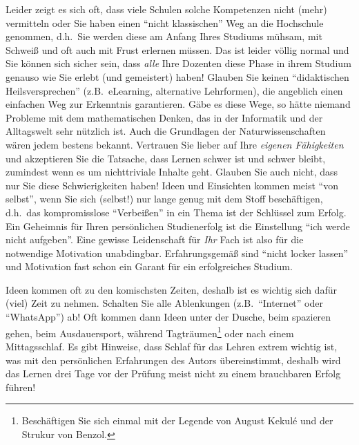 Leider zeigt es sich oft, dass viele Schulen solche Kompetenzen nicht
(mehr) vermitteln oder Sie haben einen "`nicht klassischen"' Weg an die Hochschule 
genommen, d.h.~Sie werden diese am Anfang Ihres Studiums
mühsam, mit Schweiß und oft auch mit Frust erlernen müssen. Das ist 
leider völlig normal und Sie können sich sicher sein, dass \emph{alle} Ihre Dozenten
diese Phase in ihrem Studium genauso wie Sie erlebt (und gemeistert) 
haben! Glauben Sie keinen "`didaktischen Heilsversprechen"' (z.B.~eLearning, alternative 
Lehrformen), die angeblich einen einfachen Weg  zur Erkenntnis garantieren. Gäbe es diese Wege, 
so hätte niemand Probleme mit dem mathematischen Denken, das in der Informatik und der 
Alltagswelt sehr nützlich ist. Auch die Grundlagen der Naturwissenschaften wären jedem bestens 
bekannt. Vertrauen Sie lieber auf Ihre \emph{eigenen Fähigkeiten} und akzeptieren Sie die 
Tatsache, dass Lernen  schwer ist  und schwer bleibt,  zumindest wenn es um nichttriviale Inhalte 
geht. Glauben Sie  auch nicht,  dass nur Sie  diese Schwierigkeiten haben! Ideen und Einsichten 
kommen  meist "`von selbst"', wenn Sie  sich (selbst!)  nur lange  genug mit dem Stoff 
beschäftigen, d.h.~das kompromisslose "`Verbeißen"' in ein Thema ist der Schlüssel zum Erfolg. 
Ein Geheimnis für Ihren persönlichen Studienerfolg ist die Einstellung "`ich werde nicht
aufgeben"'. Eine gewisse Leidenschaft für \emph{Ihr} Fach ist also für die
notwendige Motivation unabdingbar.  Erfahrungsgemäß sind "`nicht locker lassen"'
und Motivation fast schon ein Garant für ein erfolgreiches Studium.

Ideen kommen oft zu den komischsten Zeiten, deshalb ist es wichtig
sich dafür (viel) Zeit zu nehmen. Schalten Sie alle Ablenkungen (z.B.~"`Internet"' oder  
"`WhatsApp"') ab! Oft kommen dann Ideen unter der Dusche, beim spazieren gehen, beim 
Ausdauersport, während Tagträumen\footnote{Beschäftigen Sie sich einmal 
mit der Legende von  August Kekulé und der Strukur von Benzol.} oder nach einem 
Mittagsschlaf. Es gibt Hinweise, dass Schlaf für das Lehren extrem wichtig ist, was
mit den persönlichen Erfahrungen des Autors übereinstimmt, deshalb wird das 
Lernen drei Tage vor der Prüfung meist nicht zu einem brauchbaren Erfolg führen!

